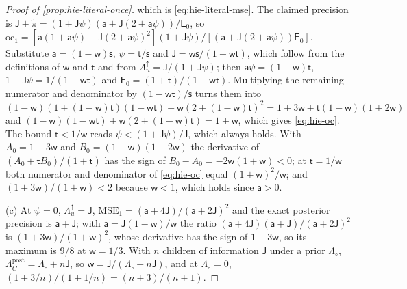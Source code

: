 \begin{proof}[Proof of \cref{prop:hie-literal-once}]
which is \eqref{eq:hie-literal-mse}. The claimed precision is $\mathsf J+\tilde\pi=(1+\mathsf J\psi)(\mathsf a+\mathsf J(2+\mathsf a\psi))/\mathsf E_0$, so $\mathrm{oc}_1=[\mathsf a(1+\mathsf a\psi)+\mathsf J(2+\mathsf a\psi)^2](1+\mathsf J\psi)/[(\mathsf a+\mathsf J(2+\mathsf a\psi))\mathsf E_0]$. Substitute $\mathsf a=(1-\mathsf w)\mathsf s$, $\psi=\mathsf t/\mathsf s$ and $\mathsf J=\mathsf w\mathsf s/(1-\mathsf w\mathsf t)$, which follow from the definitions of $\mathsf w$ and $\mathsf t$ and from $\Lambda^\uparrow_u=\mathsf J/(1+\mathsf J\psi)$; then $\mathsf a\psi=(1-\mathsf w)\mathsf t$, $1+\mathsf J\psi=1/(1-\mathsf w\mathsf t)$ and $\mathsf E_0=(1+\mathsf t)/(1-\mathsf w\mathsf t)$. Multiplying the remaining numerator and denominator by $(1-\mathsf w\mathsf t)/\mathsf s$ turns them into $(1-\mathsf w)(1+(1-\mathsf w)\mathsf t)(1-\mathsf w\mathsf t)+\mathsf w(2+(1-\mathsf w)\mathsf t)^2=1+3\mathsf w+\mathsf t(1-\mathsf w)(1+2\mathsf w)$ and $(1-\mathsf w)(1-\mathsf w\mathsf t)+\mathsf w(2+(1-\mathsf w)\mathsf t)=1+\mathsf w$, which gives \eqref{eq:hie-oc}. The bound $\mathsf t<1/\mathsf w$ reads $\psi<(1+\mathsf J\psi)/\mathsf J$, which always holds. With $A_0=1+3\mathsf w$ and $B_0=(1-\mathsf w)(1+2\mathsf w)$ the derivative of $(A_0+\mathsf tB_0)/(1+\mathsf t)$ has the sign of $B_0-A_0=-2\mathsf w(1+\mathsf w)<0$; at $\mathsf t=1/\mathsf w$ both numerator and denominator of \eqref{eq:hie-oc} equal $(1+\mathsf w)^2/\mathsf w$; and $(1+3\mathsf w)/(1+\mathsf w)<2$ because $\mathsf w<1$, which holds since $\mathsf a>0$.

(c) At $\psi=0$, $\Lambda^\uparrow_u=\mathsf J$, $\mathrm{MSE}_1=(\mathsf a+4\mathsf J)/(\mathsf a+2\mathsf J)^2$ and the exact posterior precision is $\mathsf a+\mathsf J$; with $\mathsf a=\mathsf J(1-\mathsf w)/\mathsf w$ the ratio $(\mathsf a+4\mathsf J)(\mathsf a+\mathsf J)/(\mathsf a+2\mathsf J)^2$ is $(1+3\mathsf w)/(1+\mathsf w)^2$, whose derivative has the sign of $1-3\mathsf w$, so its maximum is $9/8$ at $\mathsf w=1/3$. With $n$ children of information $\mathsf J$ under a prior $\Lambda_\circ$, $\Lambda^{\mathrm{post}}_C=\Lambda_\circ+n\mathsf J$, so $\mathsf w=\mathsf J/(\Lambda_\circ+n\mathsf J)$, and at $\Lambda_\circ=0$, $(1+3/n)/(1+1/n)=(n+3)/(n+1)$.
\end{proof}

